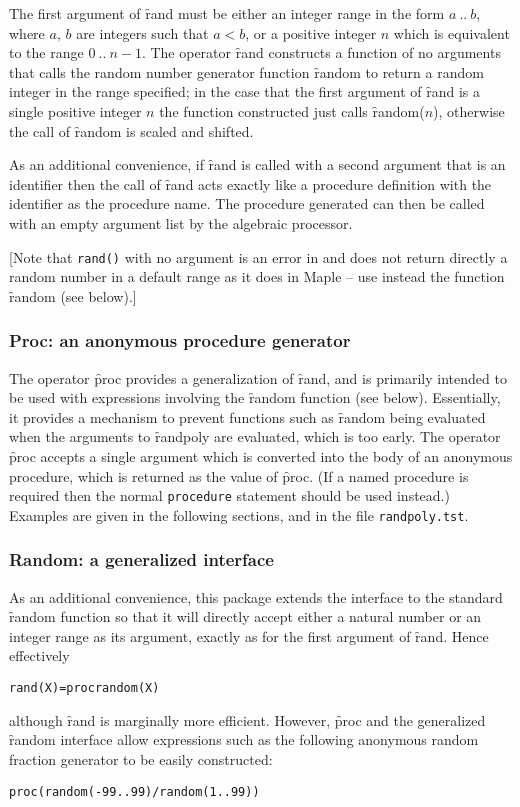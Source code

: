 The first argument of \f{rand} must be either an integer range in
the form $a~..~b$, where $a$, $b$ are integers such that $a < b$, or a
positive integer $n$ which is equivalent to the range $0~..~n-1$.  The
operator \f{rand} constructs a function of no arguments that calls
the \REDUCE random number generator function \f{random} to return a
random integer in the range specified; in the case that the first
argument of \f{rand} is a single positive integer $n$ the function
constructed just calls \f{random($n$)}, otherwise the call of
\f{random} is scaled and shifted.

As an additional convenience, if \f{rand} is called with a second
argument that is an identifier then the call of \f{rand} acts
exactly like a procedure definition with the identifier as the
procedure name.  The procedure generated can then be called with an
empty argument list by the algebraic processor.

[Note that \texttt{rand()} with no argument is an error in \REDUCE and
does not return directly a random number in a default range as it does
in Maple -- use instead the \REDUCE function \f{random} (see below).]


\subsubsection{Proc: an anonymous procedure generator}

\hypertarget{operator:PROC}{}
The operator \f{proc} provides a generalization of \f{rand}, and
is primarily intended to be used with expressions involving the
\f{random} function (see below).  Essentially, it provides a mechanism to
prevent functions such as \f{random} being evaluated when the
arguments to \f{randpoly} are evaluated, which is too early.
The operator \f{proc} accepts a single argument which is converted into the body of an
anonymous procedure, which is returned as the value of \f{proc}.
(If a named procedure is required then the normal \REDUCE
\texttt{procedure} statement should be used instead.)  Examples are given in
the following sections, and in the file \texttt{randpoly.tst}.


\subsubsection{Random: a generalized interface}

As an additional convenience, this package extends the interface to
the standard \REDUCE \f{random} function so that it will directly
accept either a natural number or an integer range as its argument,
exactly as for the first argument of \f{rand}.  Hence effectively
\begin{alltt}
  rand(X) = proc random(X)
\end{alltt}
although \f{rand} is marginally more efficient.  However, \f{proc}
and the generalized \f{random} interface allow expressions such as
the following anonymous random fraction generator to be easily
constructed:
\begin{alltt}
  proc(random(-99 .. 99)/random(1 .. 99))
\end{alltt}


